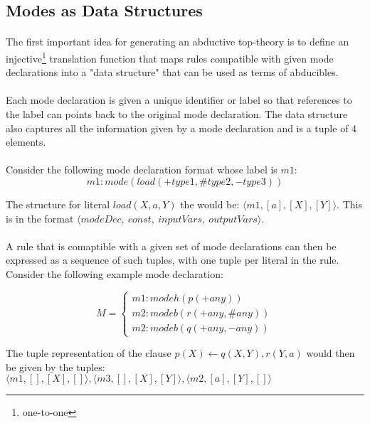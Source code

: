 \documentclass{article}
\theoremstyle{plain}
\theoremstyle{definition}
\begin{document}
\begin{multicols}{2}
\subsection{Modes as Data Structures}

\paragraph{} The first important idea for generating an abductive top-theory is to define an injective\footnote{one-to-one} translation function that maps rules compatible with given mode declarations into a "data structure" that can be used as terms of abducibles.

\paragraph{} Each mode declaration is given a unique identifier or label so that references to the label can points back to the original mode declaration. The data structure also captures all the information given by a mode declaration and is a tuple of 4 elements.

\paragraph{} Consider the following mode declaration format whose label is $m1$: $$m1: mode(load(+type1, \#type2, -type3))$$

\noindent The structure for literal $load(X, a, Y)$ the would be: $\langle m1, [a], [X], [Y]\rangle$. This is in the format $\langle modeDec,\ const,\ inputVars,\ outputVars \rangle$.

\paragraph{} A rule that is comaptible with a given set of mode declarations can then be expressed as a sequence of such tuples, with one tuple per literal in the rule. Consider the following example mode declaration:

\[
M = \begin{cases}
m1: modeh(p(+any))\\
m2: modeb(r(+any, \#any))\\
m2: modeb(q(+any, -any))
\end{cases}
\]

\noindent The tuple representation of the clause $p(X) \leftarrow q(X, Y), r(Y, a)$ would then be given by the tuples: $\langle m1, [], [X], []\rangle, \langle m3, [], [X], [Y] \rangle, \langle m2, [a], [Y], [] \rangle$


\end{multicols}
\end{document}
